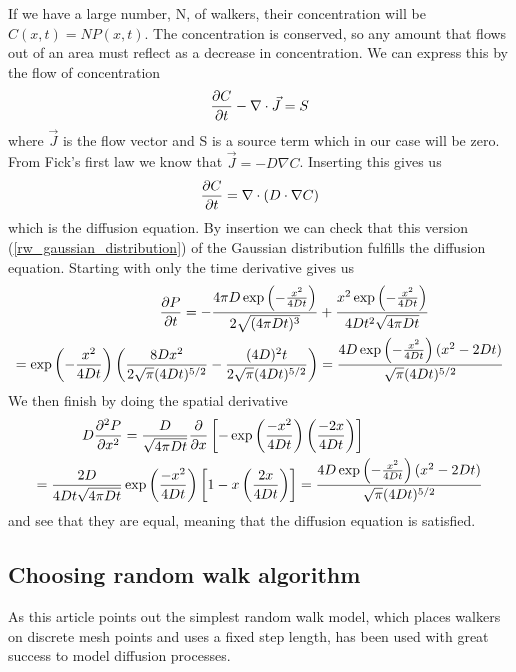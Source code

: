 If we have a large number, N, of walkers, their concentration will be $C(x,t) = NP(x,t)$. 
The concentration is conserved, so any amount that flows out of an area must reflect as a decrease in concentration. 
We can express this by the flow of concentration
\begin{equation}
 \frac{\partial C}{\partial t} -\nabla\cdot\vec{J} = S
\end{equation}
where $\vec{J}$ is the flow vector and S is a source term which in our case will be zero.
From Fick's first law we know that $\vec{J} = -D\nabla C$. Inserting this gives us
\begin{equation}\label{simple_diffusion_equation}
 \frac{\partial C}{\partial t} = \nabla\cdot \left(D\cdot\nabla C\right)
\end{equation}
which is the diffusion equation.
By insertion we can check that this version (\ref{rw_gaussian_distribution}) of the Gaussian distribution fulfills the diffusion equation. 
Starting with only the time derivative gives us
\begin{align*}
 \frac{\partial P}{\partial t} = -\frac{4\pi D\exp\left(-\frac{x^2}{4Dt}\right)}{2\sqrt{(4\pi Dt)^3}}&+\frac{x^2\exp\left(-\frac{x^2}{4Dt}\right)}{4Dt^2\sqrt{4\pi Dt}} \\
 = \exp\left(-\frac{x^2}{4Dt}\right)\left(\frac{8Dx^2}{2\sqrt{\pi}(4Dt)^{5/2}} -\frac{(4D)^2t}{2\sqrt{\pi}(4Dt)^{5/2}}\right)&= \frac{4D\exp\left(-\frac{x^2}{4Dt}\right)(x^2-2Dt)}{\sqrt{\pi}(4Dt)^{5/2}}
\end{align*}
 We then finish by doing the spatial derivative
\begin{align*}
 D\frac{\partial^2 P}{\partial x^2} &= \frac{D}{\sqrt{4\pi Dt}}\frac{\partial}{\partial x}\left[-\exp\left(\frac{-x^2}{4Dt}\right)\left(\frac{-2x}{4Dt}\right)\right]\\
 = \frac{2D}{4Dt\sqrt{4\pi Dt}}&\exp\left(\frac{-x^2}{4Dt}\right)\left[1-x\left(\frac{2x}{4Dt}\right)\right] = \frac{4D\exp\left(-\frac{x^2}{4Dt}\right)(x^2-2Dt)}{\sqrt{\pi}(4Dt)^{5/2}}
\end{align*}
and see that they are equal, meaning that the diffusion equation is satisfied.

\subsection{Choosing random walk algorithm}\label{choosing_random_walk_algorithm}

As this article points out \cite{farnell2005monte} the simplest random walk model, which places walkers on discrete mesh points and uses a fixed step length, has been used with great success to model diffusion processes. 

